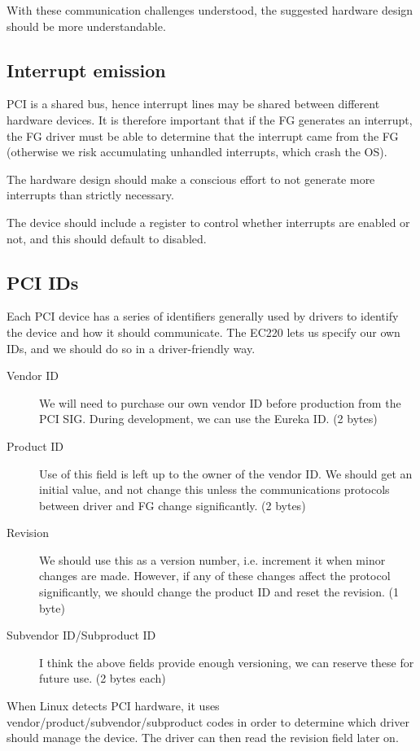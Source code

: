 \documentclass[12pt]{article}
\begin{document}
With these communication challenges understood, the suggested hardware design should be more understandable.

\subsection{Interrupt emission}

PCI is a shared bus, hence interrupt lines may be shared between different hardware devices. It is therefore important that if the FG generates an interrupt, the FG driver must be able to determine that the interrupt came from the FG (otherwise we risk accumulating unhandled interrupts, which crash the OS).

The hardware design should make a conscious effort to not generate more interrupts than strictly necessary.

The device should include a register to control whether interrupts are enabled or not, and this should default to disabled.

\subsection{PCI IDs}

Each PCI device has a series of identifiers generally used by drivers to identify the device and how it should communicate. The EC220 lets us specify our own IDs, and we should do so in a driver-friendly way.

\begin{description}
\item[Vendor ID] We will need to purchase our own vendor ID before production from the PCI SIG. During development, we can use the Eureka ID. (2 bytes)
\item[Product ID] Use of this field is left up to the owner of the vendor ID. We should get an initial value, and not change this unless the communications protocols between driver and FG change significantly. (2 bytes)
\item[Revision] We should use this as a version number, i.e. increment it when minor changes are made. However, if any of these changes affect the protocol significantly, we should change the product ID and reset the revision. (1 byte)
\item[Subvendor ID/Subproduct ID] I think the above fields provide enough versioning, we can reserve these for future use. (2 bytes each)
\end{description}

When Linux detects PCI hardware, it uses vendor/product/subvendor/subproduct codes in order to determine which driver should manage the device. The driver can then read the revision field later on.
\end{document}
